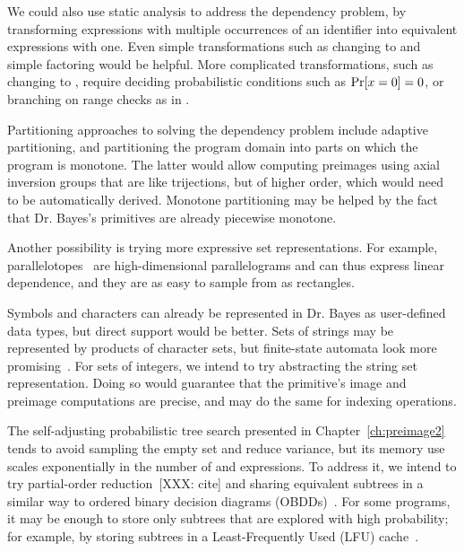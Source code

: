 We could also use static analysis to address the dependency problem, by transforming expressions with multiple occurrences of an identifier into equivalent expressions with one.
Even simple transformations such as changing  to  and simple factoring would be helpful.
More complicated transformations, such as changing  to , require deciding probabilistic conditions such as $\mathrm{Pr}\!\left[{x = 0}\right] = 0$, or branching on range checks as in .

Partitioning approaches to solving the dependency problem include adaptive partitioning, and partitioning the program domain into parts on which the program is monotone.
The latter would allow computing preimages using axial inversion groups that are like trijections, but of higher order, which would need to be automatically derived.
Monotone partitioning may be helped by the fact that Dr. Bayes's primitives are already piecewise monotone.

Another possibility is trying more expressive set representations.
For example, parallelotopes~\cite{cit:amato-2012tcs-parallelotopes} are high-dimensional parallelograms and can thus express linear dependence, and they are as easy to sample from as rectangles.

Symbols and characters can already be represented in Dr. Bayes as user-defined data types, but direct support would be better.
Sets of strings may be represented by products of character sets, but finite-state automata look more promising~\cite{cit:shannon-2007-strings}.
For sets of integers, we intend to try abstracting the string set representation.
Doing so would guarantee that the  primitive's image and preimage computations are precise, and may do the same for indexing operations.

The self-adjusting probabilistic tree search presented in Chapter~\ref{ch:preimage2} tends to avoid sampling the empty set and reduce variance, but its memory use scales exponentially in the number of  and  expressions.
To address it, we intend to try partial-order reduction~[XXX: cite] and sharing equivalent subtrees in a similar way to ordered binary decision diagrams (OBDDs)~\cite{cit:meinel-1998book-obdd}.
For some programs, it may be enough to store only subtrees that are explored with high probability; for example, by storing subtrees in a Least-Frequently Used (LFU) cache~\cite{cit:maffeis-1993-cache}.

